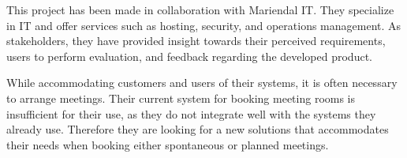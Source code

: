 This project has been made in collaboration with Mariendal IT.
They specialize in IT and offer services such as hosting, security, and operations management\cite{Mariendal_OmOs}.
As stakeholders, they have provided insight towards their perceived requirements, users to perform evaluation, and feedback regarding the developed product.


While accommodating customers and users of their systems, it is often necessary to arrange meetings.
Their current system for booking meeting rooms is insufficient for their use, as they do not integrate well with the systems they already use.
Therefore they are looking for a new solutions that accommodates their needs when booking either spontaneous or planned meetings. 
